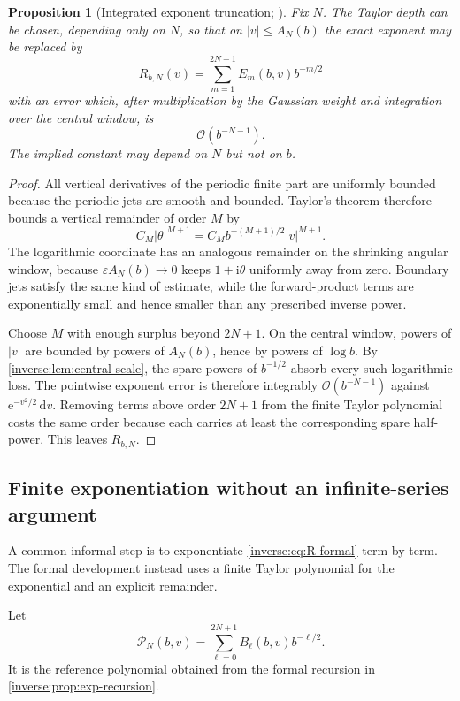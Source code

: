 \documentclass[11pt,oneside]{article}
\newtheorem{proposition}[theorem]{Proposition}
\theoremstyle{definition}
\theoremstyle{remark}
\newcommand{\e}{\mathrm e}
\newcommand{\ii}{\mathrm i}
\newcommand{\dd}{\,\mathrm d}
\newcommand{\bigO}{\mathcal O}
\begin{document}
\begin{proposition}[Integrated exponent truncation; \Formalized]
\label{inverse:prop:exponent-truncation}
Fix $N$.  The Taylor depth can be chosen, depending only on $N$, so that
on $|v|\leq A_N(b)$ the exact exponent may be replaced by
\[
 R_{b,N}(v)
 =\sum_{m=1}^{2N+1}E_m(b,v)b^{-m/2}
\]
with an error which, after multiplication by the Gaussian weight and
integration over the central window, is
\[
 \bigO(b^{-N-1}).
\]
The implied constant may depend on $N$ but not on $b$.
\end{proposition}

\begin{proof}
All vertical derivatives of the periodic finite part are uniformly
bounded because the periodic jets are smooth and bounded.  Taylor's
theorem therefore bounds a vertical remainder of order $M$ by
\[
 C_M|\theta|^{M+1}
 =C_M b^{-(M+1)/2}|v|^{M+1}.
\]
The logarithmic coordinate has an analogous remainder on the shrinking
angular window, because $\varepsilon A_N(b)\to0$ keeps
$1+\ii\theta$ uniformly away from zero.  Boundary jets satisfy the same
kind of estimate, while the forward-product terms are exponentially
small and hence smaller than any prescribed inverse power.

Choose $M$ with enough surplus beyond $2N+1$.  On the central window,
powers of $|v|$ are bounded by powers of $A_N(b)$, hence by powers of
$\log b$.  By \cref{inverse:lem:central-scale}, the spare powers of $b^{-1/2}$
absorb every such logarithmic loss.  The pointwise exponent error is
therefore integrably $\bigO(b^{-N-1})$ against
$\e^{-v^2/2}\dd v$.  Removing terms above order $2N+1$ from the finite
Taylor polynomial costs the same order because each carries at least the
corresponding spare half-power.  This leaves $R_{b,N}$.
\end{proof}

\subsection{Finite exponentiation without an infinite-series argument}

A common informal step is to exponentiate \eqref{inverse:eq:R-formal} term by
term.  The formal development instead uses a finite Taylor polynomial for
the exponential and an explicit remainder.

Let
\[
 \mathcal P_N(b,v)
 =\sum_{\ell=0}^{2N+1}B_\ell(b,v)b^{-\ell/2}.
 \label{inverse:eq:reference-polynomial}
\]
It is the reference polynomial obtained from the formal recursion in
\cref{inverse:prop:exp-recursion}.
\end{document}

